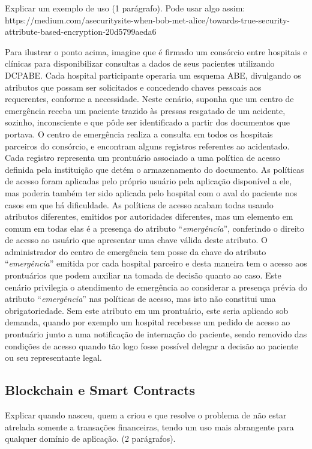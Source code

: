 \documentclass[a4paper,11pt]{article}
\begin{document}
{\color{ForestGreen}Explicar um exemplo de uso (1 parágrafo). Pode usar algo assim: https://medium.com/asecuritysite-when-bob-met-alice/towards-true-security-attribute-based-encryption-20d5799aeda6}

Para ilustrar o ponto acima, imagine que é firmado um consórcio entre hospitais e clínicas para disponibilizar consultas a dados de seus pacientes utilizando DCPABE.
Cada hospital participante operaria um esquema ABE, divulgando os atributos que possam ser solicitados e concedendo chaves pessoais aos requerentes, conforme a necessidade.
Neste cenário, suponha que um centro de emergência receba um paciente trazido às pressas resgatado de um acidente, sozinho, inconsciente e que pôde ser identificado a partir dos documentos que portava.
O centro de emergência realiza a consulta em todos os hospitais parceiros do consórcio, e encontram alguns registros referentes ao acidentado.
Cada registro representa um prontuário associado a uma política de acesso definida pela instituição que detém o armazenamento do documento.
As políticas de acesso foram aplicadas pelo próprio usuário pela aplicação disponível a ele, mas poderia também ter sido aplicada pelo hospital com o aval do paciente nos casos em que há dificuldade.
As políticas de acesso acabam todas usando atributos diferentes, emitidos por autoridades diferentes, mas um elemento em comum em todas elas é a presença do atributo ``\emph{emergência}'', conferindo o direito de acesso ao usuário que apresentar uma chave válida deste atributo.
O administrador do centro de emergência tem posse da chave do atributo ``\emph{emergência}'' emitida por cada hospital parceiro e desta maneira tem o acesso aos prontuários que podem auxiliar na tomada de decisão quanto ao caso.
Este cenário privilegia o atendimento de emergência ao considerar a presença prévia do atributo ``\emph{emergência}'' nas políticas de acesso, mas isto não constitui uma obrigatoriedade.
Sem este atributo em um prontuário, este seria aplicado sob demanda, quando por exemplo um hospital recebesse um pedido de acesso ao prontuário junto a uma notificação de internação do paciente, sendo removido das condições de acesso quando tão logo fosse possível delegar a decisão ao paciente ou seu representante legal.

\subsection{Blockchain e Smart Contracts}

{\color{ForestGreen}Explicar quando nasceu, quem a criou e que resolve o problema de não estar atrelada somente a transações financeiras, tendo um uso mais abrangente para qualquer domínio de aplicação. (2 parágrafos).}
\end{document}
